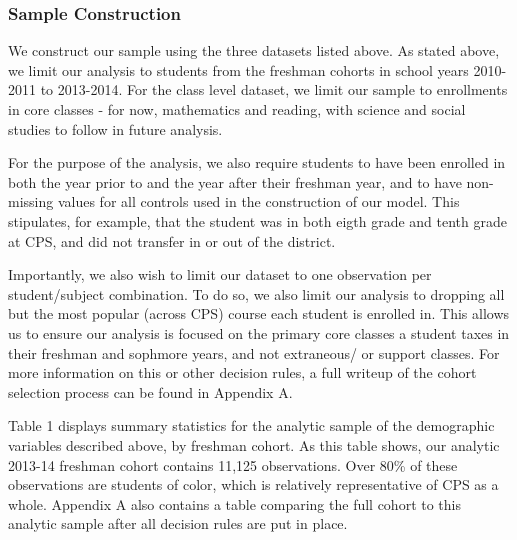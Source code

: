 \documentclass[../thesis_main.tex]{subfiles}
\begin{document}
\subsubsection{Sample Construction}

We construct our sample using the three datasets listed above. As stated above, we limit our analysis to students from the freshman cohorts in school years 2010-2011 to 2013-2014. For the class level dataset, we limit our sample to enrollments in core classes - for now, mathematics and reading, with science and social studies to follow in future analysis. %

For the purpose of the analysis, we also require students to have been enrolled in both the year prior to and the year after their freshman year, and to have non-missing values for all controls used in the construction of our model. This stipulates, for example, that the student was in both eigth grade and tenth grade at CPS, and did not transfer in or out of the district. 


Importantly, we also wish to limit our dataset to one observation per student/subject combination. To do so, we also limit our analysis to dropping all but the most popular (across CPS) course each student is enrolled in. This allows us to ensure our analysis is focused on the primary core classes a student taxes in their freshman and sophmore years, and not extraneous/ or support classes. For more information on this or other decision rules, a full writeup of the cohort selection process can be found in Appendix A. 


Table 1 displays summary statistics for the analytic sample of the demographic variables described above, by freshman cohort. As this table shows, our analytic 2013-14 freshman cohort contains 11,125 observations. Over 80\% of these observations are students of color, which is relatively representative of CPS as a whole. Appendix A also contains a table comparing the full cohort to this analytic sample after all decision rules are put in place. 
\end{document}

